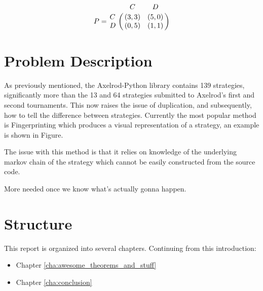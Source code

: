 \begin{equation}\label{eq:payoff_matrix}
% 
P = \bordermatrix{~ & C & D \cr
                  C & (3, 3) & (5, 0) \cr
                  D & (0, 5) & (1, 1) \cr}
% 
\end{equation}

\section{Problem Description}

As previously mentioned, the Axelrod-Python library contains 139 strategies, significantly more than the 13 and 64 strategies submitted to Axelrod's first and second tournaments.
This now raises the issue of duplication, and subsequently, how to tell the difference between strategies.
Currently the most popular method is Fingerprinting which produces a visual representation of a strategy, an example is shown in Figure.

The issue with this method is that it relies on knowledge of the underlying markov chain of the strategy which cannot be easily constructed from the source code.

More needed once we know what's actually gonna happen.


\section{Structure}
This report is organized into several chapters. Continuing from this introduction:

\begin{itemize}
    \item Chapter \ref{cha:awesome_theorems_and_stuff}
    
    \item Chapter \ref{cha:conclusion}
\end{itemize}










